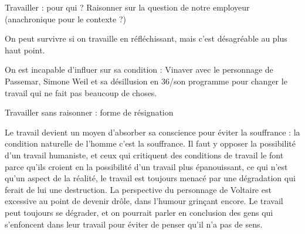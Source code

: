 \documentclass[a4paper,12pt]{book}
\begin{document}
\par Travailler : pour qui ? Raisonner sur la question de notre employeur (anachronique pour le contexte ?)
\par On peut survivre si on travaille en réfléchissant, mais c'est désagréable au plus haut point.
\par On est incapable d'influer sur sa condition : Vinaver avec le personnage de Passemar, Simone Weil et sa désillusion en 36/son programme pour changer le travail qui ne fait pas beaucoup de choses.
\par Travailler sans raisonner : forme de résignation
\par Le travail devient un moyen d'absorber sa conscience pour éviter la souffrance : la condition naturelle de l'homme c'est la souffrance. Il faut y opposer la possibilité d'un travail humaniste, et ceux qui critiquent des conditions de travail le font parce qu'ils croient en la possibilité d'un travail plus épanouissant, ce qui n'est qu'un aspect de la réalité, le travail est toujours menacé par une dégradation qui ferait de lui une destruction. La perspective du personnage de Voltaire est excessive au point de devenir drôle, dans l'humour grinçant encore. Le travail peut toujours se dégrader, et on pourrait parler en conclusion des gens qui s'enfoncent dans leur travail pour éviter de penser qu'il n'a pas de sens.
\end{document}
